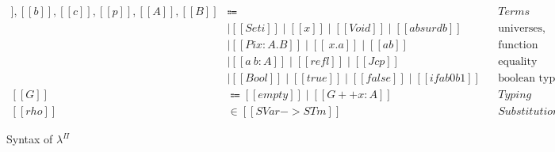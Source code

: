 \documentclass[\ifpublic nolinenum\else\fi,online,OA]{jfp}
\newcommand{\scw}[1]{}
\newcommand{\lang}{$\lambda^{\Pi}$\xspace}
\theoremstyle{definition}
\begin{document}

\begin{figure}[h]
\begin{align*}
[[a]],[[b]],[[c]],[[p]],[[A]],[[B]] & \Coloneqq && \textit{Terms} \\
            & \mid [[Set i]] \mid [[x]] \mid [[Void]] \mid [[absurd b]]
              && \textrm{universes, variables, empty type, explosion} \\
            & \mid [[Pi x : A . B]] \mid [[\ x . a]] \mid [[a b]]
              && \textrm{function types, abstractions, applications} \\
            & \mid [[a ~ b : A ]] \mid [[refl]] \mid [[J c p]]
              && \textrm{equality types, reflexivity proof, J eliminator} \\
            & \mid [[Bool]] \mid [[true]] \mid [[false]] \mid [[if a b0 b1]]
              && \textrm{boolean type, true, false, conditionals} \\
[[G]] & \Coloneqq [[empty]] \mid [[G ++ x : A]] && \textit{Typing contexts} \\
[[rho]] & \in [[SVar -> STm]] && \textit{Substitutions}
\end{align*}
\caption{Syntax of \lang}
\label{fig:syntax}
\end{figure}
\end{document}
